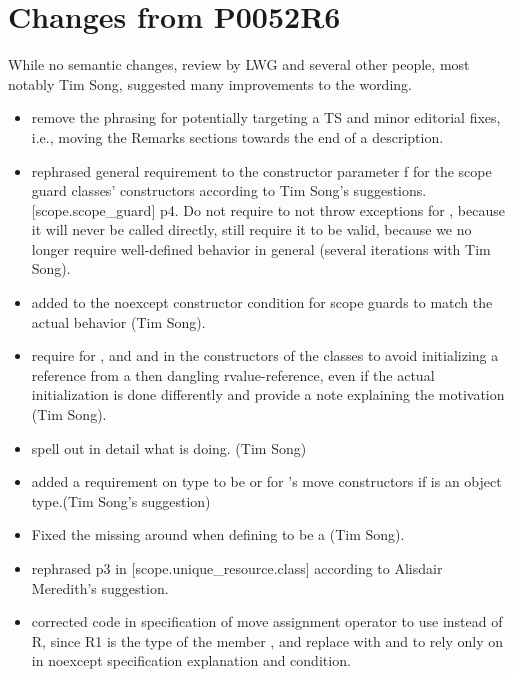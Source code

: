 \documentclass[ebook,11pt,article]{memoir}
\begin{document}
\section{Changes from P0052R6}
While no semantic changes, review by LWG and several other people, most notably Tim Song, suggested many improvements to the wording.
\begin{itemize}
\item remove the phrasing for potentially targeting a TS and minor editorial fixes, i.e., moving the Remarks sections towards the end of a description.
\item rephrased general requirement to the constructor parameter f for the scope guard classes' constructors according to Tim Song's suggestions. [scope.scope_guard] p4. Do not require  to not throw exceptions for , because it will never be called directly, still require it to be valid, because we no longer require well-defined behavior in general (several iterations with Tim Song).
\item added  to the noexcept constructor condition for scope guards to match the actual behavior (Tim Song).
\item require  for , and  and  in the constructors of the classes to avoid initializing a reference from a then dangling rvalue-reference, even if the actual initialization is done differently and provide a note explaining the motivation (Tim Song). 
\item spell out in detail what  is doing. (Tim Song)
\item added a requirement on type  to be  or  for 's move constructors if  is an object type.(Tim Song's suggestion)
\item Fixed the missing  around  when defining  to be a  (Tim Song).
\item rephrased p3 in [scope.unique_resource.class] according to Alisdair Meredith's suggestion.
\item corrected code in specification of  move assignment operator to use  instead of R, since R1 is the type of the member , and replace  with  and to rely only on  in noexcept specification explanation and  condition.

\end{itemize}
\end{document}
